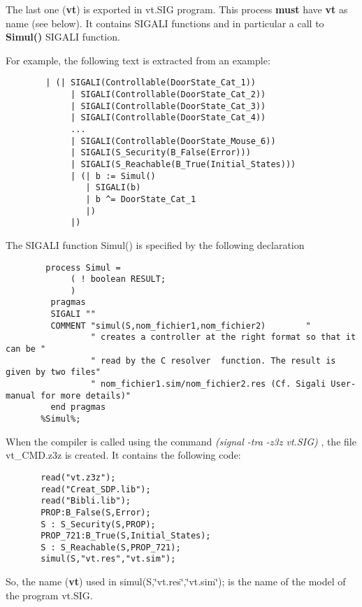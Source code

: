 The last one ({\bf vt}) is exported in vt.SIG program. This process {\bf must} have {\bf vt} as name (see below). It contains SIGALI functions and in particular a call to {\bf Simul()} SIGALI function.\par
 For example, the following text is extracted from an example: 

\footnotesize\begin{verbatim}        | (| SIGALI(Controllable(DoorState_Cat_1))
             | SIGALI(Controllable(DoorState_Cat_2))
             | SIGALI(Controllable(DoorState_Cat_3))
             | SIGALI(Controllable(DoorState_Cat_4))
             ...
             | SIGALI(Controllable(DoorState_Mouse_6))
             | SIGALI(S_Security(B_False(Error)))
             | SIGALI(S_Reachable(B_True(Initial_States)))
             | (| b := Simul()
                | SIGALI(b)
                | b ^= DoorState_Cat_1
                |)
             |)
\end{verbatim}
\normalsize
 The SIGALI function Simul() is specified by the following declaration 

\footnotesize\begin{verbatim}        process Simul =
             ( ! boolean RESULT;
             )    
         pragmas 
         SIGALI ""
         COMMENT "simul(S,nom_fichier1,nom_fichier2)        "
                 " creates a controller at the right format so that it can be "
                 " read by the C resolver  function. The result is given by two files"
                 " nom_fichier1.sim/nom_fichier2.res (Cf. Sigali User-manual for more details)"
         end pragmas
       %Simul%; 
\end{verbatim}
\normalsize
 When the compiler is called using the command {\em  (signal -tra -z3z vt.SIG) \/}, the file vt\_\-CMD.z3z is created. It contains the following code: 

\footnotesize\begin{verbatim}       read("vt.z3z");
       read("Creat_SDP.lib");
       read("Bibli.lib");
       PROP:B_False(S,Error);
       S : S_Security(S,PROP);
       PROP_721:B_True(S,Initial_States);
       S : S_Reachable(S,PROP_721);
       simul(S,"vt.res","vt.sim");
\end{verbatim}
\normalsize
 So, the name ({\bf vt}) used in simul(S,\char`\"{}vt.res\char`\"{},\char`\"{}vt.sim\char`\"{}); is the name of the model of the program vt.SIG.


